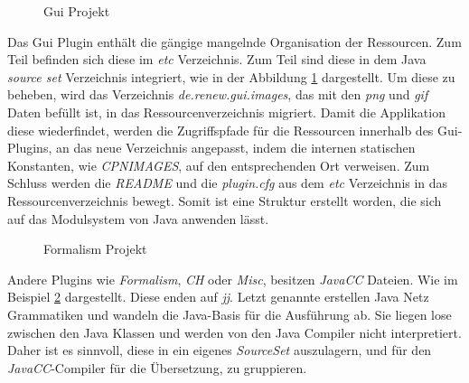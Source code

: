	\begin{figure}[h!]
		\centering
		\small
		\setlength{\DTbaselineskip}{7pt}
		\begin{minipage}{7cm}
		\end{minipage}
		\caption{Gui Projekt}
		\label{fig:gui}
	\end{figure}

	Das Gui Plugin enthält die gängige mangelnde Organisation der Ressourcen. Zum Teil befinden sich diese im \textit{etc} Verzeichnis. Zum Teil sind diese in dem Java \textit{source set} Verzeichnis integriert, wie in der Abbildung \ref{fig:gui} dargestellt.\newline
	Um diese zu beheben, wird das Verzeichnis \textit{de.renew.gui.images}, das mit den \textit{png} und \textit{gif} Daten befüllt ist, in das Ressourcenverzeichnis migriert. Damit die Applikation diese wiederfindet, werden die Zugriffspfade für die Ressourcen innerhalb des Gui-Plugins, an das neue Verzeichnis angepasst, indem die internen statischen Konstanten, wie \textit{CPNIMAGES}, auf den entsprechenden Ort verweisen. \newline
	Zum Schluss werden die \textit{README} und die \textit{plugin.cfg}  aus dem \textit{etc} Verzeichnis in das Ressourcenverzeichnis bewegt. Somit ist eine Struktur erstellt worden, die sich auf das Modulsystem von Java anwenden lässt. \bigbreak

	\begin{figure}[h!]
		\centering
		\small
		\setlength{\DTbaselineskip}{7pt}
		\begin{minipage}{7cm}
		\end{minipage}
	  \caption{Formalism Projekt}
	  \label{fig:formalism}
	\end{figure}

	Andere Plugins wie \textit{Formalism}, \textit{CH} oder \textit{Misc}, besitzen \textit{JavaCC} Dateien. Wie im Beispiel \ref{fig:formalism} dargestellt. Diese enden auf \textit{jj}. Letzt genannte erstellen Java Netz Grammatiken und wandeln die Java-Basis für die Ausführung ab. Sie liegen lose zwischen den Java Klassen und werden von den Java Compiler nicht interpretiert. Daher ist es sinnvoll, diese in ein eigenes \textit{SourceSet} auszulagern, und für den \textit{JavaCC}-Compiler für die Übersetzung, zu gruppieren.

